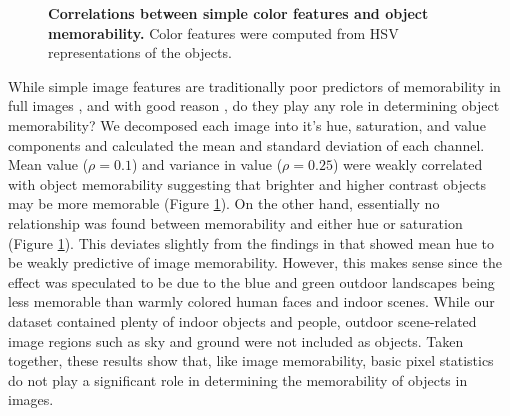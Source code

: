 \begin{figure}[t]
\centering
{}
\vspace{-5mm}\caption{\footnotesize\textbf{Correlations between simple color features and object memorability.} Color features were computed from HSV representations of the objects. }\label{fig:simple}
\end{figure}

While simple image features are traditionally poor predictors of memorability in full images \cite{isola11}, and with good reason \cite{konkle10}, do they play any role in determining object memorability? We decomposed each image into it's hue, saturation, and value components and calculated the mean and standard deviation of each channel. Mean value ($\rho = 0.1$) and variance in value ($\rho=0.25$) were weakly correlated with object memorability suggesting that brighter and higher contrast objects may be more memorable (Figure \ref{fig:simple}). On the other hand, essentially no relationship was found between memorability and either hue or saturation (Figure \ref{fig:simple}). This deviates slightly from the findings in \cite{isola11} that showed mean hue to be weakly predictive of image memorability. However, this makes sense since the effect was speculated to be due to the blue and green outdoor landscapes being less memorable than warmly colored human faces and indoor scenes. While our dataset contained plenty of indoor objects and people, outdoor scene-related image regions such as sky and ground were not included as objects. Taken together, these results show that, like image memorability, basic pixel statistics do not play a significant role in determining the memorability of objects in images.

